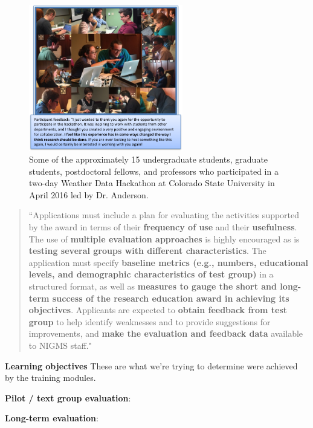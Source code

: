 \documentclass[pdftex,english,11pt,parskip=half]{scrartcl}
\begin{document}
\begin{figure}
\centering
\includegraphics[width = 0.6\textwidth]{figures/csu_hackathon.png}
\caption{Some of the approximately 15 undergraduate students, graduate students, postdoctoral fellows, and professors who participated in a two-day Weather Data Hackathon at Colorado State University in April 2016 led by Dr. Anderson.}
\label{csu-r-hackathon} 
\end{figure}

\begin{quotation}
``Applications must include a plan for evaluating the activities supported by the award in terms of their \textbf{frequency of use} and their \textbf{usefulness}. The use of \textbf{multiple evaluation approaches} is highly encouraged as is \textbf{testing several groups with different characteristics}. The application must specify \textbf{baseline metrics (e.g., numbers, educational levels, and demographic characteristics of test group)} in a structured format, as well as \textbf{measures to gauge the short and long-term success of the research education award in achieving its objectives}. Applicants are expected to \textbf{obtain feedback from test group} to help identify weaknesses and to provide suggestions for improvements, and \textbf{make the evaluation and feedback data} available to NIGMS staff."
\end{quotation}



\textbf{Learning objectives} These are what we're trying to determine were achieved by the training modules.

\textbf{Pilot / text group evaluation}:

\textbf{Long-term evaluation}:
\end{document}
